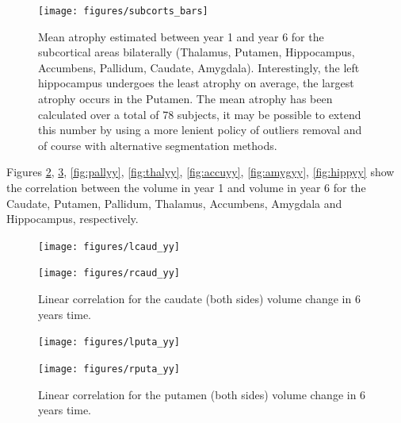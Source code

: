 \documentclass[11pt]{article}
\theoremstyle{definition}
\theoremstyle{remark}
\begin{document}
\begin{figure}[!htb]
        \centering
        \texttt{[image: figures/subcorts\_bars]}
        \caption{Mean atrophy estimated between year 1 and year 6 for the subcortical areas bilaterally (Thalamus, Putamen, Hippocampus, Accumbens, Pallidum, Caudate, Amygdala). Interestingly, the left hippocampus undergoes the least atrophy on average, the largest atrophy occurs in the Putamen. The mean atrophy has been calculated over a total of 78 subjects, it may be possible to extend this number by using a more lenient policy of outliers removal and of course with alternative segmentation methods.}
        \label{fig:subyybars}
\end{figure}

Figures \ref{fig:caudyy}, \ref{fig:putayy}, \ref{fig:pallyy}, \ref{fig:thalyy}, \ref{fig:accuyy}, \ref{fig:amygyy}, \ref{fig:hippyy} show the correlation between the volume in year 1 and volume in year 6 for the Caudate, Putamen, Pallidum, Thalamus, Accumbens, Amygdala and Hippocampus, respectively.

\begin{figure}[!htb]
    \centering
    \begin{minipage}{.45\textwidth}
        \centering
        \texttt{[image: figures/lcaud\_yy]} %
    \end{minipage}%
    \hfill
    \begin{minipage}{0.45\textwidth}
        \centering
        \texttt{[image: figures/rcaud\_yy]}
    \end{minipage}
    \caption{Linear correlation for the caudate (both sides) volume change in 6 years time.}
    \label{fig:caudyy}
\end{figure}

\begin{figure}[!htb]
    \centering
    \begin{minipage}{.45\textwidth}
        \centering
        \texttt{[image: figures/lputa\_yy]} %
    \end{minipage}%
    \hfill
    \begin{minipage}{0.45\textwidth}
        \centering
        \texttt{[image: figures/rputa\_yy]}
    \end{minipage}
    \caption{Linear correlation for the putamen (both sides) volume change in 6 years time.}
    \label{fig:putayy}
\end{figure}
\end{document}
